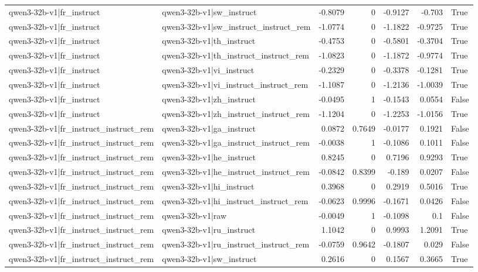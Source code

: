 \begin{table}
\begin{tabular}{l l r r r r l}
qwen3-32b-v1|fr_instruct & qwen3-32b-v1|sw_instruct & -0.8079 & 0 & -0.9127 & -0.703 & True \\
qwen3-32b-v1|fr_instruct & qwen3-32b-v1|sw_instruct_instruct_rem & -1.0774 & 0 & -1.1822 & -0.9725 & True \\
qwen3-32b-v1|fr_instruct & qwen3-32b-v1|th_instruct & -0.4753 & 0 & -0.5801 & -0.3704 & True \\
qwen3-32b-v1|fr_instruct & qwen3-32b-v1|th_instruct_instruct_rem & -1.0823 & 0 & -1.1872 & -0.9774 & True \\
qwen3-32b-v1|fr_instruct & qwen3-32b-v1|vi_instruct & -0.2329 & 0 & -0.3378 & -0.1281 & True \\
qwen3-32b-v1|fr_instruct & qwen3-32b-v1|vi_instruct_instruct_rem & -1.1087 & 0 & -1.2136 & -1.0039 & True \\
qwen3-32b-v1|fr_instruct & qwen3-32b-v1|zh_instruct & -0.0495 & 1 & -0.1543 & 0.0554 & False \\
qwen3-32b-v1|fr_instruct & qwen3-32b-v1|zh_instruct_instruct_rem & -1.1204 & 0 & -1.2253 & -1.0156 & True \\
qwen3-32b-v1|fr_instruct_instruct_rem & qwen3-32b-v1|ga_instruct & 0.0872 & 0.7649 & -0.0177 & 0.1921 & False \\
qwen3-32b-v1|fr_instruct_instruct_rem & qwen3-32b-v1|ga_instruct_instruct_rem & -0.0038 & 1 & -0.1086 & 0.1011 & False \\
qwen3-32b-v1|fr_instruct_instruct_rem & qwen3-32b-v1|he_instruct & 0.8245 & 0 & 0.7196 & 0.9293 & True \\
qwen3-32b-v1|fr_instruct_instruct_rem & qwen3-32b-v1|he_instruct_instruct_rem & -0.0842 & 0.8399 & -0.189 & 0.0207 & False \\
qwen3-32b-v1|fr_instruct_instruct_rem & qwen3-32b-v1|hi_instruct & 0.3968 & 0 & 0.2919 & 0.5016 & True \\
qwen3-32b-v1|fr_instruct_instruct_rem & qwen3-32b-v1|hi_instruct_instruct_rem & -0.0623 & 0.9996 & -0.1671 & 0.0426 & False \\
qwen3-32b-v1|fr_instruct_instruct_rem & qwen3-32b-v1|raw & -0.0049 & 1 & -0.1098 & 0.1 & False \\
qwen3-32b-v1|fr_instruct_instruct_rem & qwen3-32b-v1|ru_instruct & 1.1042 & 0 & 0.9993 & 1.2091 & True \\
qwen3-32b-v1|fr_instruct_instruct_rem & qwen3-32b-v1|ru_instruct_instruct_rem & -0.0759 & 0.9642 & -0.1807 & 0.029 & False \\
qwen3-32b-v1|fr_instruct_instruct_rem & qwen3-32b-v1|sw_instruct & 0.2616 & 0 & 0.1567 & 0.3665 & True \\

\end{tabular}
\end{table}
